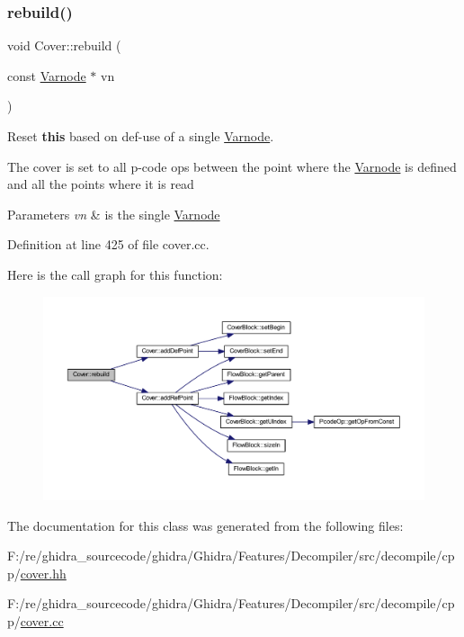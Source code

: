 \subsubsection{\texorpdfstring{rebuild()}{rebuild()}}
{\footnotesize\ttfamily void Cover\+::rebuild (\begin{DoxyParamCaption}\item[{const \mbox{\hyperlink{class_varnode}{Varnode}} $\ast$}]{vn }\end{DoxyParamCaption})}



Reset {\bfseries{this}} based on def-\/use of a single \mbox{\hyperlink{class_varnode}{Varnode}}. 

The cover is set to all p-\/code ops between the point where the \mbox{\hyperlink{class_varnode}{Varnode}} is defined and all the points where it is read 
\begin{DoxyParams}{Parameters}
{\em vn} & is the single \mbox{\hyperlink{class_varnode}{Varnode}} \\
\hline
\end{DoxyParams}


Definition at line 425 of file cover.\+cc.

Here is the call graph for this function\+:
\nopagebreak
\begin{figure}[H]
\begin{center}
\leavevmode
\includegraphics[width=350pt]{class_cover_a1d437f9e8a60e407587935411ed6d546_cgraph}
\end{center}
\end{figure}


The documentation for this class was generated from the following files\+:\begin{DoxyCompactItemize}
\item 
F\+:/re/ghidra\+\_\+sourcecode/ghidra/\+Ghidra/\+Features/\+Decompiler/src/decompile/cpp/\mbox{\hyperlink{cover_8hh}{cover.\+hh}}\item 
F\+:/re/ghidra\+\_\+sourcecode/ghidra/\+Ghidra/\+Features/\+Decompiler/src/decompile/cpp/\mbox{\hyperlink{cover_8cc}{cover.\+cc}}\end{DoxyCompactItemize}
